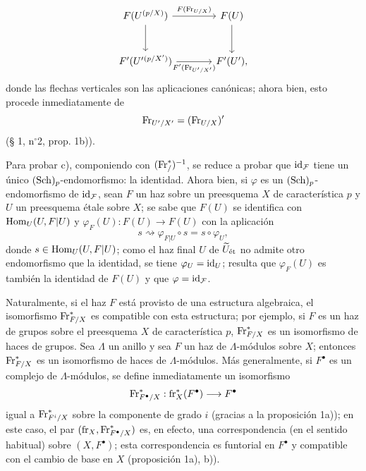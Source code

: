 \[
\begin{tikzcd}[column sep=large,row sep=large]
F(U^{(p/X)}) \arrow[r,"F(\Fr_{U/X})"] \arrow[d]
& F(U) \arrow[d]\\
F'(U'{}^{(p/X')}) \arrow[r,"F'(\Fr_{U'/X'})"']
& F'(U') ,
\end{tikzcd}
\]
donde las flechas verticales son las aplicaciones canónicas; ahora bien, esto procede inmediatamente de
\[
\operatorname{Fr}_{U'/X'}=(\operatorname{Fr}_{U/X})'
\]
(§ 1, n$^\circ$2, prop. 1b)).

Para probar c), componiendo con $(\operatorname{Fr}^*_{/})^{-1}$, se reduce a probar que $\operatorname{id}_{\mathcal F}$ tiene un único $(\operatorname{Sch})_p$-endomorfismo: la identidad. Ahora bien, si $\varphi$ es un $(\operatorname{Sch})_p$-endomorfismo de $\operatorname{id}_{\mathcal F}$, sean $F$ un haz sobre un preesquema $X$ de característica $p$ y $U$ un preesquema étale sobre $X$; se sabe que $F(U)$ se identifica con $\operatorname{Hom}_U(U,F|U)$ y $\varphi_F(U):F(U)\to F(U)$ con la aplicación
\[
s\rightsquigarrow \varphi_{F|U}\circ s=s\circ\varphi_U,
\]
donde $s\in\operatorname{Hom}_U(U,F|U)$; como el haz final $U$ de $\widetilde U_{\mathrm{\acute{e}t}}$ no admite otro endomorfismo que la identidad, se tiene $\varphi_U=\operatorname{id}_U$; resulta que $\varphi_F(U)$ es también la identidad de $F(U)$ y que $\varphi=\operatorname{id}_{\mathcal F}$.

Naturalmente, si el haz $F$ está provisto de una estructura algebraica, el isomorfismo $\operatorname{Fr}^*_{F/X}$ es compatible con esta estructura; por ejemplo, si $F$ es un haz de grupos sobre el preesquema $X$ de característica $p$, $\operatorname{Fr}^*_{F/X}$ es un isomorfismo de haces de grupos. Sea $\Lambda$ un anillo y sea $F$ un haz de $\Lambda$-módulos sobre $X$; entonces $\operatorname{Fr}^*_{F/X}$ es un isomorfismo de haces de $\Lambda$-módulos. Más generalmente, si $F^\bullet$ es un complejo de $\Lambda$-módulos, se define inmediatamente un isomorfismo
\[
\operatorname{Fr}^*_{F^\bullet/X}:\operatorname{fr}_X^*(F^\bullet)\longrightarrow F^\bullet
\]
igual a $\operatorname{Fr}^*_{F^i/X}$ sobre la componente de grado $i$ (gracias a la proposición 1a)); en este caso, el par $(\operatorname{fr}_X,\operatorname{Fr}^*_{F^\bullet/X})$ es, en efecto, una correspondencia (en el sentido habitual) sobre $(X,F^\bullet)$; esta correspondencia es funtorial en $F^\bullet$ y compatible con el cambio de base en $X$ (proposición 1a), b)).
